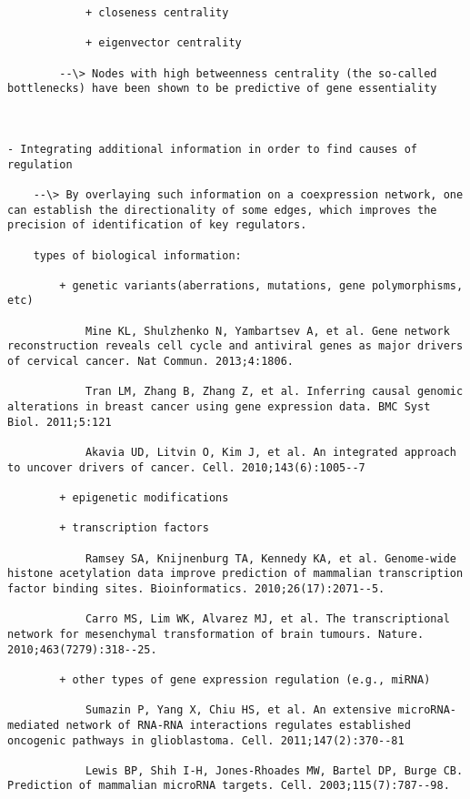 \documentclass[
]{book}
\begin{document}
\begin{verbatim}
            + closeness centrality

            + eigenvector centrality

        --\> Nodes with high betweenness centrality (the so-called bottlenecks) have been shown to be predictive of gene essentiality



- Integrating additional information in order to find causes of regulation

    --\> By overlaying such information on a coexpression network, one can establish the directionality of some edges, which improves the precision of identification of key regulators.

    types of biological information:

        + genetic variants(aberrations, mutations, gene polymorphisms, etc)

            Mine KL, Shulzhenko N, Yambartsev A, et al. Gene network reconstruction reveals cell cycle and antiviral genes as major drivers of cervical cancer. Nat Commun. 2013;4:1806.

            Tran LM, Zhang B, Zhang Z, et al. Inferring causal genomic alterations in breast cancer using gene expression data. BMC Syst Biol. 2011;5:121

            Akavia UD, Litvin O, Kim J, et al. An integrated approach to uncover drivers of cancer. Cell. 2010;143(6):1005--7

        + epigenetic modifications

        + transcription factors

            Ramsey SA, Knijnenburg TA, Kennedy KA, et al. Genome-wide histone acetylation data improve prediction of mammalian transcription factor binding sites. Bioinformatics. 2010;26(17):2071--5.

            Carro MS, Lim WK, Alvarez MJ, et al. The transcriptional network for mesenchymal transformation of brain tumours. Nature. 2010;463(7279):318--25.

        + other types of gene expression regulation (e.g., miRNA)

            Sumazin P, Yang X, Chiu HS, et al. An extensive microRNA-mediated network of RNA-RNA interactions regulates established oncogenic pathways in glioblastoma. Cell. 2011;147(2):370--81

            Lewis BP, Shih I-H, Jones-Rhoades MW, Bartel DP, Burge CB. Prediction of mammalian microRNA targets. Cell. 2003;115(7):787--98.


\end{verbatim}
\end{document}

